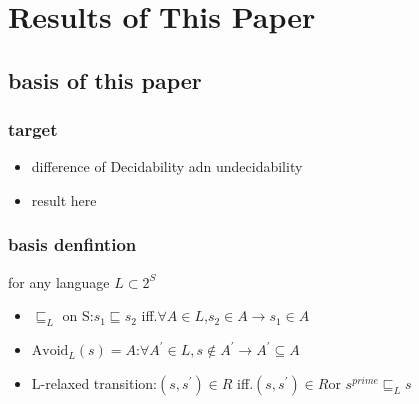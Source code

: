 \section{Results of This Paper}
\subsection{basis of this paper}
\begin{frame}
    \frametitle{target}
    \begin{itemize}
        \item difference of Decidability adn undecidability
        \item result here
    \end{itemize}
\end{frame}
\begin{frame}
    \frametitle{basis denfintion}
    for any language $L\subset 2^{S}$
    \begin{itemize}
        \item $\sqsubseteq_{L}$ on S:$s_{1}\sqsubseteq s_{2}$ iff.$\forall A\in L$,$s_{2}\in A\rightarrow s_{1}\in A$
        \item $\text{Avoid}_{L}(s)=A$:$\forall A^{\prime}\in L, s\notin A^{\prime}\rightarrow A^{\prime}\subseteq A$
        \item L-relaxed transition:$(s,s^{\prime})\in R$ iff.$(s,s^{\prime})\in R$or $s^{prime}\sqsubseteq_{L}s$
    \end{itemize}
\end{frame}
